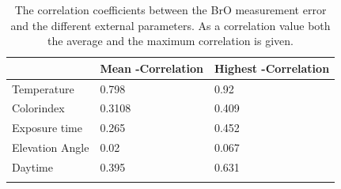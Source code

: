 \documentclass  [
  paper    = a4,
  BCOR     = 10mm,
  twoside,
  fontsize = 12pt,
  fleqn,
  toc      = bibnumbered,
  toc      = listofnumbered,
  numbers  = noendperiod,
  headings = normal,
  listof   = leveldown,
  version  = 3.03
]                                       {scrreprt}
\begin{document}
	\begin{table}[h]
		\centering
		\begin{tabular}{|p{4cm}|p{3cm}|p{3cm}|}
			&  Mean -Correlation&  Highest   -Correlation\\
			\toprule
			Temperature &0.798&	0.92\\
			\midrule
			Colorindex &0.3108&	0.409\\
			\midrule
			Exposure time &0.265&	0.452\\
			\midrule
			Elevation Angle &0.02&	0.067\\
			\midrule
			Daytime &0.395&	0.631\\
			\bottomrule
			\label{tab:CorrEP}
		\end{tabular}
	\caption{The correlation coefficients between the BrO measurement error and the different external parameters. As a correlation value both the average and the maximum correlation is given.}
	\end{table}
\end{document}
